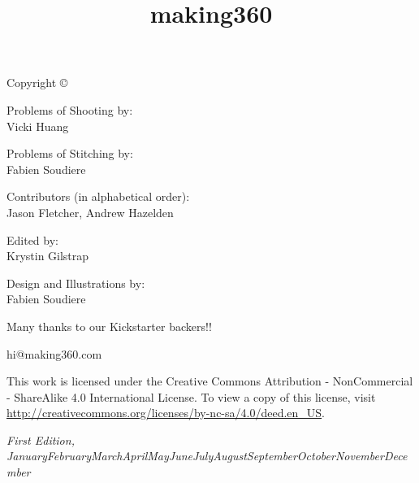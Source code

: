 \documentclass[notoc, justified]{tufte-book}
\title{making360} %
\author{} %
\newcommand{\monthyear}{\ifcase\month\or January\or February\or March\or April\or May\or June\or July\or August\or September\or October\or November\or December\fi\space\number\year} %
\begin{document}
\setlength{\parskip}{12pt}
\setlength{\parindent}{0pt}
\let\cleardoublepage\clearpage

\makeatletter
\def\@makechapterhead#1{%
  {\parindent \z@ \raggedright \normalfont
    \ifnum \c@secnumdepth >\m@ne
        \huge\bfseries \@chapapp\space \thechapter
        \par\nobreak
        \vskip 20\p@
    \fi
    \interlinepenalty\@M
    \Huge \bfseries #1\par\nobreak
    \vskip 20\p@
  }}
\makeatother


\frontmatter



\maketitlepage


\newpage
\thispagestyle{empty}
\setlength{\parindent}{0pt}
\setlength{\parskip}{\baselineskip}
Copyright \copyright\ \the\year\ \thanklessauthor


\begin{fullwidth}

\par{Problems of Shooting by:
\\
Vicki Huang}

\par{Problems of Stitching by:
\\
Fabien Soudiere}

\par{Contributors (in alphabetical order):
\\
Jason Fletcher, Andrew Hazelden}

\par{Edited by:
\\
Krystin Gilstrap}

\par{Design and Illustrations by: 
\\
Fabien Soudiere}

\par{Many thanks to our Kickstarter backers!!}

\par{hi@making360.com}

\par This work is licensed under the Creative Commons Attribution - NonCommercial - ShareAlike 4.0 International License. To view a copy of this license, visit \url{http://creativecommons.org/licenses/by-nc-sa/4.0/deed.en_US}.

\par\textit{First Edition, \monthyear}
\end{fullwidth}
\end{document}
